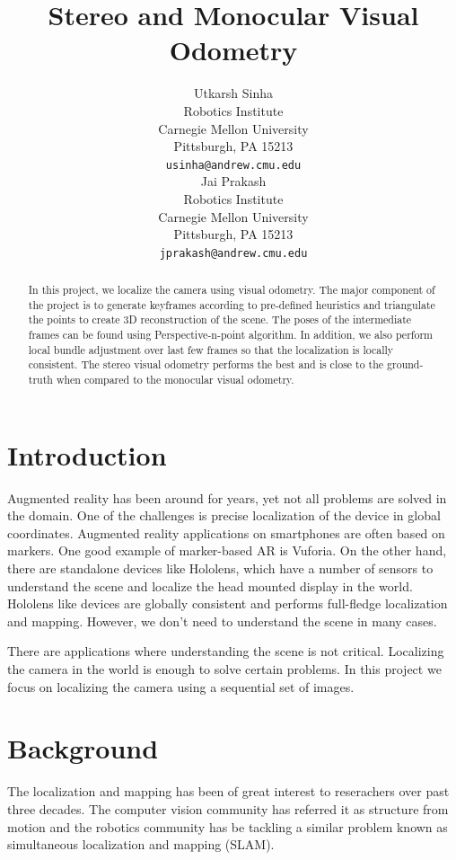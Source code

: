 \documentclass{article}
\title{Stereo and Monocular Visual Odometry}
\author{
 Utkarsh Sinha \\
  Robotics Institute\\
 Carnegie Mellon University \\
 Pittsburgh, PA 15213\\
  \texttt{usinha@andrew.cmu.edu} \\
\And
  Jai Prakash\\
  Robotics Institute\\
  Carnegie Mellon University\\
  Pittsburgh, PA 15213\\
  \texttt{jprakash@andrew.cmu.edu} \\
}
\begin{document}

\maketitle

\begin{abstract}
In this project, we localize the camera using visual odometry. The major component of the project is to generate keyframes according to pre-defined heuristics and triangulate the points to create 3D reconstruction of the scene. The poses of the intermediate frames can be found using Perspective-n-point algorithm. In addition, we also perform local bundle adjustment over last few frames so that the localization is locally consistent. The stereo visual odometry performs the best and is close to the ground-truth when compared to the monocular visual odometry. 
\end{abstract}

\section{Introduction}

Augmented reality has been around for years, yet not all problems are solved in the domain. One of the challenges is precise localization of the device in global coordinates. Augmented reality applications on smartphones are often based on markers. One good example of marker-based AR is Vuforia. On the other hand, there are standalone devices like Hololens, which have a number of sensors to understand the scene and localize the head mounted display in the world. Hololens like devices are globally consistent and performs full-fledge localization and mapping. However, we don't need to understand the scene in many cases.

There are applications where understanding the scene is not critical. Localizing the camera in the world is enough to solve certain problems. In this project we focus on localizing the camera using a sequential set of images.


\section{Background}
The localization and mapping has been of great interest to reserachers over past three decades. The computer vision community has referred it as structure from motion and the robotics community has be tackling a similar problem known as simultaneous localization and mapping (SLAM).
\end{document}
